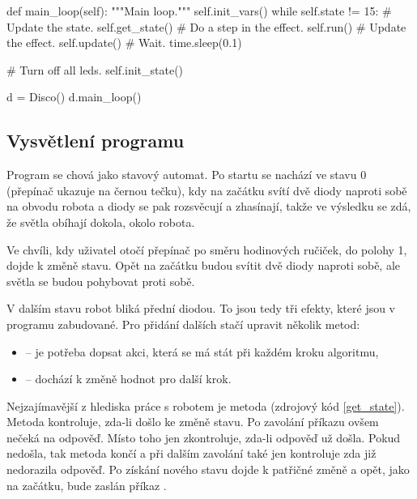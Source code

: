\begin{mylisting}
\begin{pyc}
    def main_loop(self):
        """Main loop."""
        self.init_vars()
        while self.state != 15:
            # Update the state.
            self.get_state()
            # Do a step in the effect.
            self.run()
            # Update the effect.
            self.update()
            # Wait.
            time.sleep(0.1)

        # Turn off all leds.
        self.init_state()

d = Disco()
d.main_loop()
\end{pyc}
\end{mylisting}

\subsection{Vysvětlení programu}

Program se chová jako stavový automat. Po startu se nachází ve stavu 0
(přepínač ukazuje na černou tečku), kdy na začátku svítí dvě diody naproti sobě
na obvodu robota a diody se pak rozsvěcují a zhasínají, takže ve výsledku se
zdá, že světla obíhají dokola, okolo robota.

Ve chvíli, kdy uživatel otočí přepínač po směru hodinových ručiček, do polohy 1,
dojde k změně stavu. Opět na začátku budou svítit dvě diody naproti sobě, ale
světla se budou pohybovat proti sobě.

V dalším stavu robot bliká přední diodou. To jsou tedy tři efekty, které jsou v
programu zabudované. Pro přidání dalších stačí upravit několik metod:

\begin{itemize}
    \item {} -- je potřeba dopsat akci, která se má stát při každém kroku algoritmu,
    \item {} -- dochází k změně hodnot pro další krok.
\end{itemize}

Nejzajímavější z hlediska práce s robotem je metoda  (zdrojový
kód \ref{get_state}). Metoda kontroluje, zda-li došlo ke změně stavu. Po
zavolání příkazu  ovšem nečeká na odpověď. Místo
toho jen zkontroluje, zda-li odpověď už došla. Pokud nedošla, tak metoda končí
a při dalším zavolání také jen kontroluje zda již nedorazila odpověď. Po
získání nového stavu dojde k patřičné změně a opět, jako na začátku, bude
zaslán příkaz .

